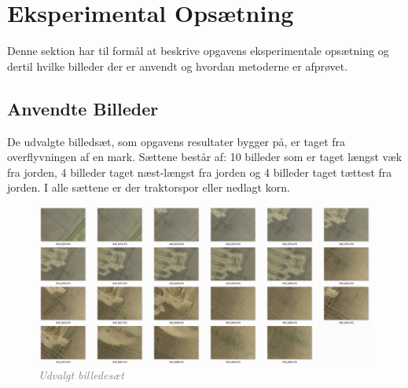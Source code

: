 \chapter{Eksperimental Opsætning}
Denne sektion har til formål at beskrive opgavens eksperimentale opsætning og dertil hvilke billeder der er anvendt og hvordan metoderne er afprøvet.
\section{Anvendte Billeder}
De udvalgte billedsæt, som opgavens resultater bygger på, er taget fra overflyvningen af en mark. Sættene består af: 10 billeder som er taget længst væk fra jorden, 4 billeder taget næst-længst fra jorden og 4 billeder taget tættest fra jorden. I alle sættene er der traktorspor eller nedlagt korn.

\begin{figure}[H]
    \centering
    \includegraphics[width=1\textwidth]{fig/43a.png}
    \vspace{-0.5em}   
    \begin{center}
    \caption{\textcolor{gray}{\footnotesize \textit{Udvalgt billedesæt}}}
    \label{fig:lindblob}
     \end{center}
  \end{figure}
       \vspace{-2.7em}
\noindent
